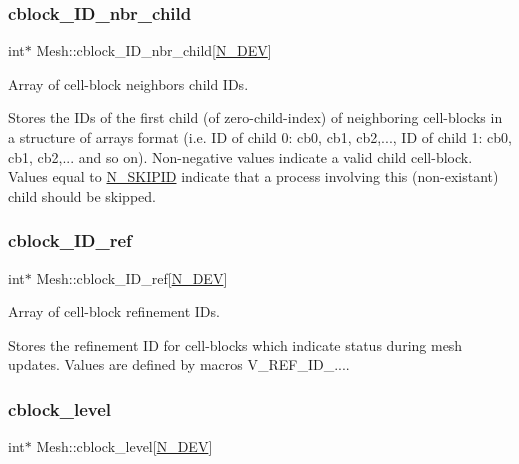 \subsubsection{\texorpdfstring{cblock\+\_\+\+I\+D\+\_\+nbr\+\_\+child}{cblock\_ID\_nbr\_child}}
{\footnotesize\ttfamily int$\ast$ Mesh\+::cblock\+\_\+\+I\+D\+\_\+nbr\+\_\+child\mbox{[}\hyperlink{cppspec_8h_a2b674dab7a14f1bf32b48b7fda5022dc}{N\+\_\+\+D\+EV}\mbox{]}}



Array of cell-\/block neighbor\textquotesingle{}s child I\+Ds. 

Stores the I\+Ds of the first child (of zero-\/child-\/index) of neighboring cell-\/blocks in a structure of arrays format (i.\+e. ID of child 0\+: cb0, cb1, cb2,..., ID of child 1\+: cb0, cb1, cb2,... and so on). Non-\/negative values indicate a valid child cell-\/block. Values equal to \hyperlink{cppspec_8h_ae7141a84f3fe0ddcd628a6d8ee0a4ea8}{N\+\_\+\+S\+K\+I\+P\+ID} indicate that a process involving this (non-\/existant) child should be skipped. \mbox{\label{classMesh_a4bc1d7b73f4d7fdae4f547eef4684b7b}} 
\subsubsection{\texorpdfstring{cblock\+\_\+\+I\+D\+\_\+ref}{cblock\_ID\_ref}}
{\footnotesize\ttfamily int$\ast$ Mesh\+::cblock\+\_\+\+I\+D\+\_\+ref\mbox{[}\hyperlink{cppspec_8h_a2b674dab7a14f1bf32b48b7fda5022dc}{N\+\_\+\+D\+EV}\mbox{]}}



Array of cell-\/block refinement I\+Ds. 

Stores the refinement ID for cell-\/blocks which indicate status during mesh updates. Values are defined by macros V\+\_\+\+R\+E\+F\+\_\+\+I\+D\+\_\+.... \mbox{\label{classMesh_ab5fd345e916788a1add5c7da96526b16}} 
\subsubsection{\texorpdfstring{cblock\+\_\+level}{cblock\_level}}
{\footnotesize\ttfamily int$\ast$ Mesh\+::cblock\+\_\+level\mbox{[}\hyperlink{cppspec_8h_a2b674dab7a14f1bf32b48b7fda5022dc}{N\+\_\+\+D\+EV}\mbox{]}}



